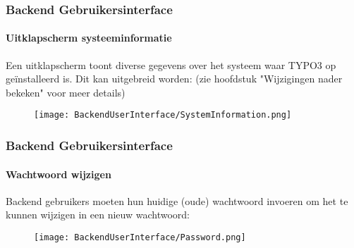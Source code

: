 \begin{frame}[fragile]
	\frametitle{Backend Gebruikersinterface}
	\framesubtitle{Uitklapscherm systeeminformatie}

	Een uitklapscherm toont diverse gegevens over het systeem waar TYPO3 op
	geïnstalleerd is. Dit kan uitgebreid worden:\newline
	\small(zie hoofdstuk "Wijzigingen nader bekeken" voor meer details)\normalsize

	\begin{figure}
		\texttt{[image: BackendUserInterface/SystemInformation.png]}
	\end{figure}

\end{frame}

\begin{frame}[fragile]
	\frametitle{Backend Gebruikersinterface}
	\framesubtitle{Wachtwoord wijzigen}

	Backend gebruikers moeten hun huidige (oude) wachtwoord invoeren om het te
	kunnen wijzigen in een nieuw wachtwoord:

	\begin{figure}
		\texttt{[image: BackendUserInterface/Password.png]}
	\end{figure}

\end{frame}

